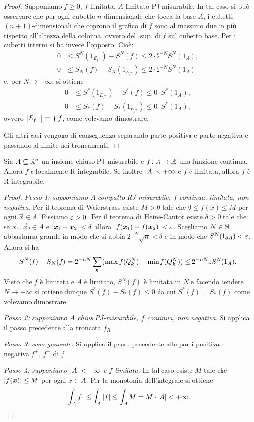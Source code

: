 \begin{proof}
Supponiamo $f\ge 0$, $f$ limitata, $A$ limitato PJ-misurabile.
In tal caso si può osservare che 
per ogni cubetto $n$-dimensionale che tocca la base $A$, 
i cubetti $(n+1)$-dimensionali che coprono il grafico di $f$ 
sono al massimo due in più rispetto all'altezza della colonna, 
ovvero del $\sup$ di $f$ 
sul cubetto base. Per i cubetti interni si ha invece l'opposto. Cioè:
\begin{align*}
    0 & \le S^N(1_{E_{f^+}}) - S^N(f) \le 2\cdot 2^{-N} S^N(1_A),\\
    0 & \le S_N(f) - S_N(1_{E_{f^+}}) \le 2\cdot 2^{-N} S^N(1_A)
\end{align*}
e, per $N\to +\infty$, si ottiene 
\begin{align*}
  0 &\le S^*(1_{E_{f^+}}) - S^*(f) \le 0\cdot S^*(1_A), \\
  0 &\le S_*(f) - S_*(1_{E_{f^+}}) \le 0\cdot S^*(1_A), 
\end{align*}
ovvero ${\left|E_{f^+}\right|}=\int f$, come volevamo dimostrare.

Gli altri casi vengono di conseguenza separando parte positiva e parte negativa 
e passando al limite nei troncamenti.
\end{proof}

\begin{theorem}
  \label{th:continua_integrabile}
Sia $A\subseteq {\mathbb R}^n$ un insieme chiuso PJ-misurabile e $f\colon A \to {\mathbb R}$ una funzione 
continua. Allora $f$ è localmente R-integrabile. 
Se inoltre ${\left|A\right|}<+\infty$ e $f$ 
è limitata, allora $f$ è R-integrabile.
\end{theorem}
%
\begin{proof}
\emph{Passo 1: supponiamo $A$ compatto RJ-misurabile, 
$f$ continua, limitata, non negativa.}
Per il teorema di Weierstrass esiste $M>0$ tale che $0\le f(x) \le M$ per 
ogni $\vec x \in A$.
Fissiamo $\varepsilon>0$.
Per il teorema di Heine-Cantor esiste $\delta>0$ tale 
che se $\vec x_1,\vec x_2\in A$ e ${\left|\boldsymbol x_1 -\boldsymbol x_2\right|}<\delta$ 
allora ${\left|f(\boldsymbol x_1)-f(\boldsymbol x_2)\right|}< \varepsilon$. 
Scegliamo $N\in {\mathbb N}$ abbastanza grande in modo che si abbia $2^{-N}\sqrt n < \delta$
e in modo che $S^N(1_{\partial A})<\varepsilon$.
Allora si ha
\[
  S^N(f) - S_N(f) 
  = 2^{-nN}\sum_{\boldsymbol k} (\max f(Q^N_{\boldsymbol k})-\min f(Q^N_{\boldsymbol k})) 
  \le 2^{-nN}\varepsilon S^N(1_A).
\]
Visto che $f$ è limitata e $A$ è limitato, $S^N(f)$ è limitata in $N$ 
e facendo tendere $N\to+\infty$ si ottiene 
dunque $S^*(f)-S_*(f) \le 0$ da cui $S^*(f)=S_*(f)$ come volevamo dimostrare.

\emph{Passo 2: supponiamo $A$ chius PJ-misurabile, $f$ continua, non negativa.} 
Si applica il passo precedente alla troncata $f_R$.

\emph{Passo 3: caso generale.}
Si applica il passo precedente alle parti 
positiva e negativa $f^+$, $f^-$ di $f$.

\emph{Passo 4: supponiamo ${\left|A\right|}<+\infty$ e $f$ limitata.}  
In tal caso esiste $M$ tale che ${\left|f(\boldsymbol x)\right|}\le M$ per 
ogni $x\in A$. 
Per la monotonia dell'integrale si ottiene 
\[
  {\left|\int_A f\right|} 
  \le \int_A {\left|f\right|}
  \le \int_A M = M \cdot {\left|A\right|} < +\infty.  
\]
\end{proof}

